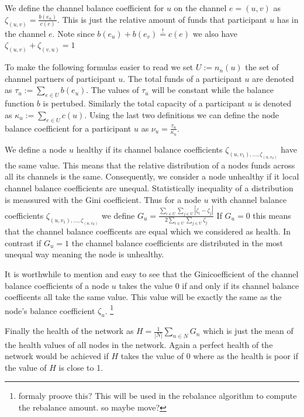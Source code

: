 \documentclass[a4paper]{paper}
\begin{document}
We define the channel balance coefficient for $u$ on the channel $e=(u,v)$ as  $\zeta_{(u,v)} = \frac{b(e_u)}{c(e)}$.
This is just the relative amount of funds that participant $u$ has in the channel $e$.
Note since $b(e_u)+b(e_v)\stackrel{!}{=}c(e)$ we also have $\zeta_{(u,v)} + \zeta_{(v,u)}=1$

To make the following formulas easier to read we set $U:=n_n(u)$ the set of channel partners of participant $u$.
The total funds of a participant $u$ are denoted as $\tau_u:=\displaystyle{\sum_{e\in U}b(e_u)}$.
The values of $\tau_u$ will be constant while the balance function $b$ is pertubed.
Similarly the total capacity of a participant $u$ is denoted as $\kappa_u:=\displaystyle{\sum_{e\in U}c(u)}$.
Using the last two definitions we can define the node balance coefficient for a participant $u$ as $\nu_u = \frac{\tau_u}{\kappa_u}$.

We define a node $u$ healthy if its channel balance coefficients $\zeta_{(u,v_1),\dots,\zeta_{(u,v_d)}}$ have the same value.
This means that the relative distribution of a nodes funds across all its channels is the same.
Consequently, we consider a node unhealthy if it local channel balance coefficients are unequal.
Statistically inequality of a distribution is meassured with the Gini coefficient.
Thus for a node $u$ with channel balance coefficients $\zeta_{(u,v_1),\dots,\zeta_{(u,v_d)}}$ we define $G_u = \frac{\displaystyle{\sum_{i\in U} \sum_{j \in U}} | \zeta_i - \zeta_j |}{2 \displaystyle{\sum_{i \in U} \sum_{j \in U} \zeta_j}}$
If $G_u = 0$ this means that the channel balance coefficents are equal which we considered as health.
In contrast if $G_u = 1$ the channel balance coefficients are distributed in the most unequal way meaning the node is unhealthy.

It is worthwhile to mention and easy to see that the Ginicoefficient of the channel balance coefficients of a node $u$ takes the value $0$ if and only if its channel balance coefficents all take the same value.
This value will be exactly the same as the node's balance coefficient $\zeta_u$. \footnote{formaly proove this? This will be used in the rebalance algorithm to compute the rebalance amount. so maybe move? }

Finally the health of the network as $H = \displaystyle{\frac{1}{|N|}\sum_{n\in N}G_n}$ which is just the mean of the health values of all nodes in the network.
Again a perfect health of the network would be achieved if $H$ takes the value of $0$ where as the health is poor if the value of $H$ is close to 1.
\end{document}
